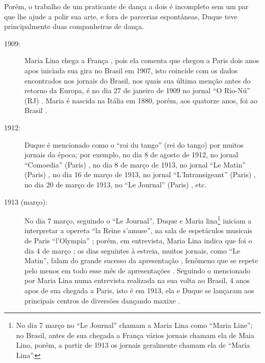 Porém, o trabalho de um praticante de dança a dois é incompleto sem um par
que lhe ajude a polir sua arte,
e fora de parcerias espontâneas, Duque teve principalmente duas companheiras de dança.
\begin{description}

\item[1909:] Maria Lina chega a França \cite[pp. 3]{maxixe1913marialina},
pois ela comenta que chegou a Paris dois anos apos iniciada sua gira no Brasil em 1907,
isto coincide com os dados encontrados nos jornais do Brasil, 
nos quais sua última menção antes do retorno da Europa,
é no dia 27 de janeiro de 1909 no jornal ``O Rio-Nú'' (RJ) \cite[pp. 3]{maxixe1909maria}.
Maria é nascida na Itália em 1880, porém, aos quatorze anos, foi ao Brasil \cite[pp. 63]{efege1974maxixe}.



\item[1912:] Duque é mencionado como o ``roi du tango'' (rei do tango)
por muitos jornais da época; por exemplo,
no dia 8 de agosto de 1912, no jornal ``Comoedia'' (Paris) \cite[pp. 3]{maxixe1913reidotango:0:b},
no dia 8 de março de 1913, no jornal ``Le Matin'' (Paris) \cite[pp. 4]{maxixe1913reidotango:0},
no dia 16 de março de 1913, no jornal ``L'Intransigeant'' (Paris)  \cite[pp. 3]{maxixe1913reidotango:1},
no dia 20 de março de 1913, no ``Le Journal'' (Paris) \cite[pp. 7]{maxixe1913reidotango:2}, 
etc.


\item[1913 (março):] No dia 7 março, seguindo o ``Le Journal'',  Duque e Maria lina\footnote{No dia 7 março
no ``Le Journal'' chamam a Maria Lina como ``Maria Line'';
no Brasil, antes de sua chegada a França vários jornais chamam ela de Maia Lino,
porém, a partir de 1913 os jornais geralmente chamam ela de ``Maria Lina''.} 
iniciam a interpretar a opereta ``la Reine s'amuse'',
na sala de espetáculos musicais de Paris ``l'Olympia'' \cite[pp. 8]{maxixe1913reidotango:0:a};
porém, em entrevista, Maria Lina indica que foi o dia 4 de março \cite[pp. 3]{maxixe1913marialina};
os dias seguintes à estreia, muitos jornais, como ``Le Matin'',
falam do grande sucesso da apresentação \cite[pp. 4]{maxixe1913reidotango:0},
fenômeno que se repete pelo menos em todo esse mês de apresentações 
\cite[pp. 4]{maxixe1913reidotango:0} \cite[pp. 3]{maxixe1913reidotango:1} \cite[pp. 7]{maxixe1913reidotango:2}.
Seguindo o mencionado por Maria Lina numa entrevista realizada na sua volta ao Brasil,
4 anos apos de sua chegada a Paris, isto é em 1913, 
ela e Duque se lançaram aos principais centros de diversões dançando maxixe \cite[pp. 3]{maxixe1913marialina}.



\end{description}
